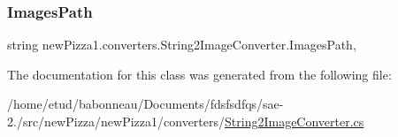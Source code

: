 \subsubsection{\texorpdfstring{Images\+Path}{ImagesPath}}
{\footnotesize\ttfamily string new\+Pizza1.\+converters.\+String2\+Image\+Converter.\+Images\+Path\hspace{0.3cm}{\ttfamily [static]}, {\ttfamily [get]}}



The documentation for this class was generated from the following file\+:\begin{DoxyCompactItemize}
\item 
/home/etud/babonneau/\+Documents/fdsfsdfqs/sae-\/2./src/new\+Pizza/new\+Pizza1/converters/\hyperlink{String2ImageConverter_8cs}{String2\+Image\+Converter.\+cs}\end{DoxyCompactItemize}
